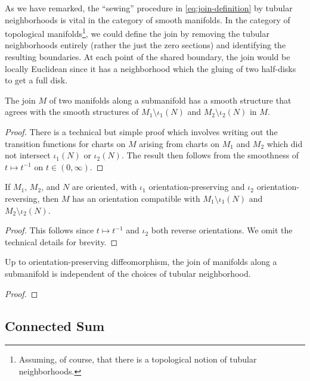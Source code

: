 \begin{remark}
	As we have remarked, the ``sewing'' procedure in \cref{eq:join-definition} by tubular neighborhoods is vital in the category of smooth manifolds. In the category of topological manifolds\footnote{Assuming, of course, that there is a topological notion of  tubular neighborhoods.}, we could define the join by removing the tubular neighborhoods entirely (rather the just the zero sections) and identifying the resulting boundaries.
	At each point of the shared boundary, the join would be locally Euclidean since it has a neighborhood which the gluing of two half-disks to get a full disk.
\end{remark}

\begin{proposition}\label{prop:join-along-submanifolds-well-defined}
	The join $M$ of two manifolds along a submanifold has a smooth structure that agrees with the smooth structures of $M_1\setminus \iota_1(N)$ and $M_2\setminus \iota_2(N)$ in $M$. 
\end{proposition}
\begin{proof}
	There is a technical but simple proof which involves writing out the transition functions for charts on $M$ arising from charts on $M_1$ and $M_2$ which did not intersect $\iota_1(N)$ or $\iota_2(N)$. The result then follows from the smoothness of $t \mapsto t^{-1}$ on $t\in (0,\infty)$.
\end{proof}

\begin{proposition}\label{prop:join-along-submanifolds-orientation}
	If $M_1$, $M_2$, and $N$ are oriented, with $\iota_1$ orientation-preserving and $\iota_2$ orientation-reversing, then $M$ has an orientation compatible with $M_1\setminus \iota_1(N)$ and $M_2\setminus \iota_2(N)$.
\end{proposition}
\begin{proof}
	This follows since $t\mapsto t^{-1}$ and $\iota_2$ both reverse orientations. We omit the technical details for brevity.
\end{proof}

\begin{theorem}
	Up to orientation-preserving diffeomorphism, the join of manifolds along a submanifold is independent of the choices of tubular neighborhood.
\end{theorem}
\begin{proof}
\end{proof}

\subsection{Connected Sum}\label{sec:connected-sum}

